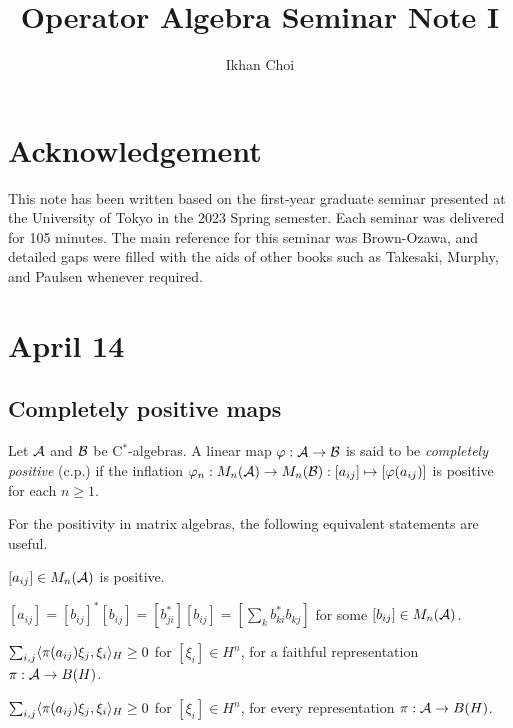 \documentclass{../../small}
\begin{document}
\title{Operator Algebra Seminar Note I}
\author{Ikhan Choi}
\maketitle
\tableofcontents


\section*{Acknowledgement}
This note has been written based on the first-year graduate seminar presented at the University of Tokyo in the 2023 Spring semester.
Each seminar was delivered for 105 minutes. %
The main reference for this seminar was Brown-Ozawa, and detailed gaps were filled with the aids of other books such as Takesaki, Murphy, and Paulsen whenever required.



\newpage
\section{April 14}

\subsection{Completely positive maps}

\begin{defn}
Let $\mathcal{A}$ and $\mathcal{B}$ be C$^*$-algebras.
A linear map $\varphi:\mathcal{A}\to\mathcal{B}$ is said to be \emph{completely positive} (c.p.) if the inflation $\varphi_n:M_n(\mathcal{A})\to M_n(\mathcal{B}):[a_{ij}]\mapsto[\varphi(a_{ij})]$ is positive for each $n\ge1$.
\end{defn}

\begin{rmk}
For the positivity in matrix algebras, the following equivalent statements are useful.
\begin{parts}
\item $[a_{ij}]\in M_n(\mathcal{A})$ is positive.
\item $[a_{ij}]=[b_{ij}]^*[b_{ij}]=[b_{ji}^*][b_{ij}]=[\sum_kb_{ki}^*b_{kj}]$ for some $[b_{ij}]\in M_n(\mathcal{A})$.
\item $\sum_{i,j}\langle\pi(a_{ij})\xi_j,\xi_i\rangle_H\ge0$ for $[\xi_i]\in H^n$, for a faithful representation $\pi:\mathcal{A}\to B(H)$.
\item $\sum_{i,j}\langle\pi(a_{ij})\xi_j,\xi_i\rangle_H\ge0$ for $[\xi_i]\in H^n$, for every representation $\pi:\mathcal{A}\to B(H)$.
\end{parts}
\end{rmk}
\end{document}
